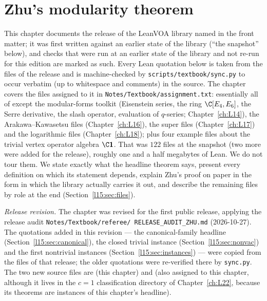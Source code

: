 \chapter{Zhu's modularity theorem}\label{ch:L15}
\begingroup\setlength{\emergencystretch}{3em}

\providecommand{\lfifteenH}{\mathbb{H}}
\providecommand{\lfifteenB}{\mathfrak{B}}
\providecommand{\lfifteenvac}{\mathbf{1}}
\providecommand{\lfifteenSL}{SL_2(\Z)}
\providecommand{\lfifteenZ}{\mathcal{Z}}
\providecommand{\lfifteenq}{\mathsf{q}}

This chapter documents the release of the LeanVOA library named in the front matter; it was first written against an earlier state of the library (``the snapshot'' below), and checks that were
run at an earlier state of the library and not re-run for this edition are marked as such. Every Lean quotation below is taken from the files of the release and is machine-checked by \texttt{scripts/textbook/sync.py} to
occur verbatim (up to whitespace and comments) in the source. The chapter covers the files assigned to it in
\texttt{Notes/Textbook/assignment.txt}: essentially all of  except the modular-forms
toolkit (Eisenstein series, the ring $\C[E_4,E_6]$, the Serre derivative, the slash operator, evaluation of $q$-series;
Chapter~\ref{ch:L14}), the Arakawa--Kawasetsu files (Chapter~\ref{ch:L16}), the super files (Chapter~\ref{ch:L17}) and
the logarithmic files (Chapter~\ref{ch:L18}); plus four example files about the trivial vertex operator algebra
$\C\lfifteenvac$. That was $122$ files at the snapshot (two more were added for the release), roughly one and a half megabytes of Lean. We do not tour them. We state exactly
what the headline theorem says, present every definition on which its statement depends, explain Zhu's proof on paper
in the form in which the library actually carries it out, and describe the remaining files by role at the end
(Section~\ref{l15:sec:files}).

\emph{Release revision.} The chapter was revised for the first public release, applying the release audit \texttt{Notes/\allowbreak Textbook/\allowbreak referee/\allowbreak
RELEASE\_AUDIT\_ZHU.md} (2026-10-27). The quotations added in this revision --- the canonical-family headline
(Section~\ref{l15:sec:canonical}), the closed trivial instance (Section~\ref{l15:sec:nonvac}) and the first nontrivial
instances (Section~\ref{l15:sec:instances}) --- were copied from the files of that release; the older quotations were
re-verified there by \texttt{sync.py}. The two new source files are  (this chapter) and  (also assigned to this chapter, although it lives in the $c=1$ classification directory of
Chapter~\ref{ch:L22}, because its theorems are instances of this chapter's headline).

